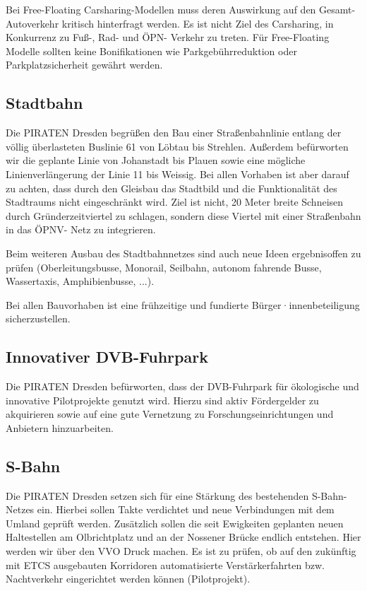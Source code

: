 \documentclass[a4paper, 11pt]{article}
\begin{document}
Bei Free-Floating Carsharing-Modellen muss deren Auswirkung auf den Gesamt-Autoverkehr kritisch hinterfragt werden. Es ist nicht Ziel des Carsharing, in Konkurrenz zu Fuß-, Rad- und ÖPN- Verkehr zu treten. Für Free-Floating Modelle sollten keine Bonifikationen wie Parkgebührreduktion oder Parkplatzsicherheit gewährt werden.



\subsection{Stadtbahn}
Die PIRATEN Dresden begrüßen den Bau einer Straßenbahnlinie entlang der völlig überlasteten Buslinie 61 von Löbtau bis Strehlen. Außerdem befürworten wir die geplante Linie von Johanstadt bis Plauen sowie eine mögliche Linienverlängerung der Linie 11 bis Weissig. Bei allen Vorhaben ist aber darauf zu achten, dass durch den Gleisbau das Stadtbild und die Funktionalität des Stadtraums nicht eingeschränkt wird. Ziel ist nicht, 20 Meter breite Schneisen durch Gründerzeitviertel zu schlagen, sondern diese Viertel mit einer Straßenbahn in das ÖPNV- Netz zu integrieren.\newline

Beim weiteren Ausbau des Stadtbahnnetzes sind auch neue Ideen ergebnisoffen zu prüfen (Oberleitungsbusse, Monorail, Seilbahn, autonom fahrende Busse, Wassertaxis, Amphibienbusse, ...).\newline

Bei allen Bauvorhaben ist eine frühzeitige und fundierte Bürger·innenbeteiligung sicherzustellen.


\subsection{Innovativer DVB-Fuhrpark}
Die PIRATEN Dresden befürworten, dass der DVB-Fuhrpark für ökologische und innovative Pilotprojekte genutzt wird. Hierzu sind aktiv Fördergelder zu akquirieren sowie auf eine gute Vernetzung zu Forschungseinrichtungen und Anbietern hinzuarbeiten.


\subsection{S-Bahn}
Die PIRATEN Dresden setzen sich für eine Stärkung des bestehenden S-Bahn-Netzes ein. Hierbei sollen Takte verdichtet und neue Verbindungen mit dem Umland geprüft werden. Zusätzlich sollen die seit Ewigkeiten geplanten neuen Haltestellen am Olbrichtplatz und an der Nossener Brücke endlich entstehen. Hier werden wir über den VVO Druck machen. Es ist zu prüfen, ob auf den zukünftig mit ETCS ausgebauten Korridoren automatisierte Verstärkerfahrten bzw. Nachtverkehr eingerichtet werden können (Pilotprojekt).
\end{document}
